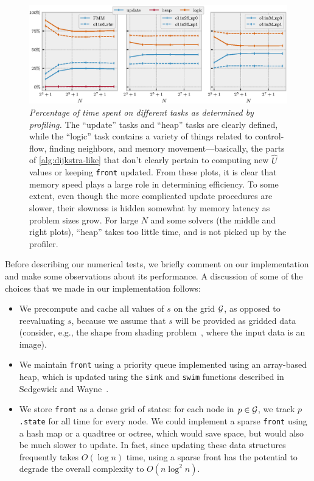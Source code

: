 \documentclass[sisc-eikonal.tex]{subfiles}
\begin{document}
\begin{figure}
  \includegraphics[width=\linewidth]{tasks.eps}%
  \vspace{-0.5em}
  \caption{\emph{Percentage of time spent on different tasks as
      determined by profiling.} The ``update'' tasks and ``heap''
    tasks are clearly defined, while the ``logic'' task contains a
    variety of things related to control-flow, finding neighbors, and
    memory movement---basically, the parts of \cref{alg:dijkstra-like}
    that don't clearly pertain to computing new $\hat{U}$ values or
    keeping \texttt{front} updated. From these plots, it is clear that
    memory speed plays a large role in determining efficiency. To some
    extent, even though the more complicated update procedures are
    slower, their slowness is hidden somewhat by memory latency as
    problem sizes grow. For large $N$ and some solvers (the middle and
    right plots), ``heap'' takes too little time, and is not picked up
    by the profiler.}\label{fig:tasks}
\end{figure}

Before describing our numerical tests, we briefly comment on our
implementation and make some observations about its performance. A
discussion of some of the choices that we made in our implementation
follows:
\begin{itemize}
\item We precompute and cache all values of $s$ on the grid $\mathcal{G}$,
  as opposed to reevaluating $s$, because we assume that $s$ will be
  provided as gridded data (consider, e.g., the shape from shading
  problem~\cite{kimmel2001optimal}, where the input data is an image).
\item We maintain \texttt{front} using a priority queue implemented
  using an array-based heap, which is updated using the \texttt{sink}
  and \texttt{swim} functions described in Sedgewick and
  Wayne~\cite{sedgewick2011algorithms}.
\item We store \texttt{front} as a dense grid of states: for each node
  in $p \in \mathcal{G}$, we track $p$\texttt{.state} for all time for every
  node. We could implement a sparse \texttt{front} using a hash map or
  a quadtree or octree, which would save space, but would also be much
  slower to update. In fact, since updating these data structures
  frequently takes $O(\log n)$ time, using a sparse front has the
  potential to degrade the overall complexity to $O(n \log^2 n)$.
\end{itemize}
\end{document}
